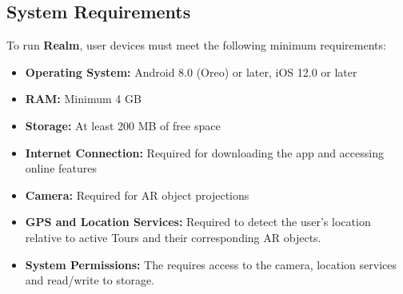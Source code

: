 \documentclass[12pt, titlepage]{article}
\newcommand{\progname}{Realm}
\begin{document}
\subsection{System Requirements}
To run \textbf{\progname{}}, user devices must meet the following minimum requirements:
\begin{itemize}[leftmargin=*]
    \item \textbf{Operating System:} Android 8.0 (Oreo) or later, iOS 12.0 or later
    \item \textbf{RAM:} Minimum 4 GB
    \item \textbf{Storage:} At least 200 MB of free space
    \item \textbf{Internet Connection:} Required for downloading the app and accessing online features
    \item \textbf{Camera:} Required for AR object projections
    \item \textbf{GPS and Location Services:} Required to detect the user's location relative to active Tours and their corresponding AR objects.
    \item \textbf{System Permissions:} The requires access to the camera, location services and read/write to storage.
\end{itemize}
\end{document}
